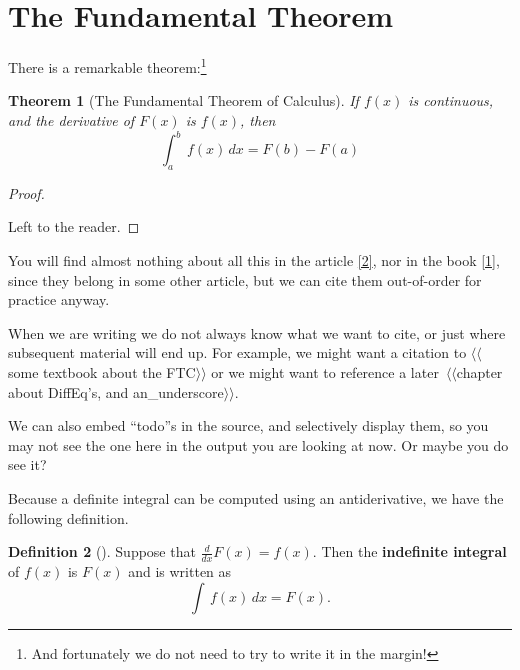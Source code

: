 \documentclass[10pt,]{article}
\newcommand{\terminology}[1]{\textbf{#1}}
\theoremstyle{plain}
\newtheorem{theorem}{Theorem}[section]
\theoremstyle{definition}
\newtheorem{definition}[theorem]{Definition}
\theoremstyle{definition}
\theoremstyle{definition}
\theoremstyle{definition}
\theoremstyle{definition}
\theoremstyle{definition}
\numberwithin{equation}{section}
\newcommand{\definiteintegral}[4]{\int_{#1}^{#2}\,#3\,d#4}
\begin{document}
\section[{The Fundamental Theorem}]{The Fundamental Theorem}\label{section-fundamental-theorem}
\hypertarget{p-4}{}%
There is a remarkable theorem:\footnote{And fortunately we do not need to try to write it in the margin!\label{footnote-fermat}}%
\begin{theorem}[{The Fundamental Theorem of Calculus}]\label{theorem-FTC}
\hypertarget{p-5}{}%
If \(f(x)\) is continuous, and the derivative of \(F(x)\) is \(f(x)\), then%
\begin{equation*}
\definiteintegral{a}{b}{f(x)}{x}=F(b)-F(a)
\end{equation*}
%
\end{theorem}
\begin{proof}\hypertarget{proof-1}{}
\hypertarget{p-6}{}%
Left to the reader.%
\end{proof}
\hypertarget{p-7}{}%
You will find almost nothing about all this in the article \hyperlink{biblio-lay-article}{[2]}, nor in the book \hyperlink{biblio-judson-AATA}{[1]}, since they belong in some other article, but we can cite them out-of-order for practice anyway.%
\par
\hypertarget{p-8}{}%
When we are writing we do not always know what we want to cite, or just where subsequent material will end up.  For example, we might want a citation to {$\langle\langle$some textbook about the FTC$\rangle\rangle$} or we might want to reference a later~{$\langle\langle$chapter about DiffEq's, and an\_underscore$\rangle\rangle$}.%
\par
\hypertarget{p-9}{}%
We can also embed ``todo''s in the source, and selectively display them, so you may not see the one here in the output you are looking at now.  Or maybe you do see it?%
\par
\hypertarget{p-10}{}%
Because a definite integral can be computed using an antiderivative, we have the following definition.%
\begin{definition}[{}]\label{definition-indefinite-integral}
\label{notation-2}
\hypertarget{p-11}{}%
Suppose that \(\frac{d}{dx}F(x)=f(x)\).  Then the \terminology{indefinite integral} of \(f(x)\) is \(F(x)\) and is written as%
\begin{equation*}
\int\,f(x)\,dx=F(x)\text{.}
\end{equation*}
%
\end{definition}
\typeout{************************************************}
\typeout{************************************************}
\end{document}
